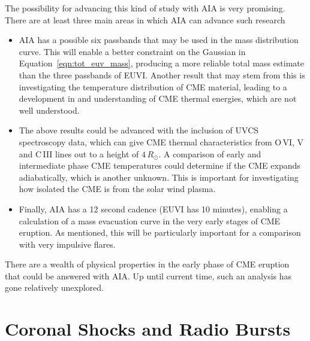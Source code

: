 The possibility for advancing this kind of study with AIA is very promising. There are at least three main areas in which AIA can advance such research
\begin{itemize}
\item AIA has a possible six passbands that may be used in the mass distribution curve. This will enable a better constraint on the Gaussian in Equation~\ref{eqn:tot_euv_mass}, producing a more reliable total mass estimate than the three passbands of EUVI. Another result that may stem from this is investigating the temperature distribution of CME material, leading to a development in and understanding of CME thermal energies, which are not well understood.
\item The above results could be advanced with the inclusion of UVCS spectroscopy data, which can give CME thermal characteristics from O\,VI, V and C\,III lines out to a height of $4\,R_{\odot}$. A comparison of early and intermediate phase CME temperatures could determine if the CME expands adiabatically, which is another unknown. This is important for investigating how isolated the CME is from the solar wind plasma.
\item Finally, AIA has a 12 second cadence (EUVI has 10 minutes), enabling a calculation of a mass evacuation curve in the very early stages of CME eruption. As mentioned, this will be particularly important for a comparison with very impulsive flares.
\end{itemize}
There are a wealth of physical properties in the early phase of CME eruption that could be answered with AIA. Up until current time, such an analysis has gone relatively unexplored.

\section{Coronal Shocks and Radio Bursts}

